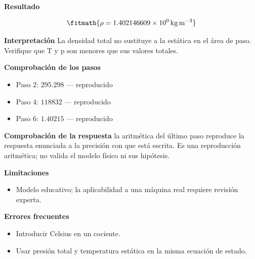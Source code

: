 \documentclass[10pt,openany]{book}
\begin{document}
\begin{tcolorbox}[title={Problema resuelto 1}, studiumworked, breakable]
\noindent\textbf{Resultado}

\[
\fitmath{\rho=1.402146609\times10^{0}\,\mathrm{kg}\,\mathrm{m}^{-3}}
\]

\noindent\textbf{Interpretación}
La densidad total no sustituye a la estática en el área de paso. Verifique que T y p son menores que sus valores totales.

\noindent\textbf{Comprobación de los pasos}
\begin{itemize}
\item Paso 2: $295.298$ — reproducido
\item Paso 4: $118832$ — reproducido
\item Paso 6: $1.40215$ — reproducido
\end{itemize}

\noindent\textbf{Comprobación de la respuesta} la aritmética del último paso reproduce la respuesta enunciada a la precisión con que está escrita. Es una reproducción aritmética; no valida el modelo físico ni sus hipótesis.

\noindent\textbf{Limitaciones}
\begin{itemize}
\item Modelo educativo; la aplicabilidad a una máquina real requiere revisión experta.
\end{itemize}

\noindent\textbf{Errores frecuentes}
\begin{itemize}
\item Introducir Celsius en un cociente.
\item Usar presión total y temperatura estática en la misma ecuación de estado.
\end{itemize}
\end{tcolorbox}
\end{document}
